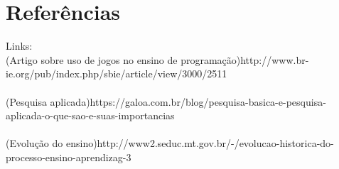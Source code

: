 \documentclass[12pt]{article}
\begin{document}
	
	\section{Referências} 
	
	Links:\\ 	(Artigo sobre uso de jogos no ensino de programação)http://www.br-ie.org/pub/index.php/sbie/article/view/3000/2511\\\\
			(Pesquisa aplicada)https://galoa.com.br/blog/pesquisa-basica-e-pesquisa-aplicada-o-que-sao-e-suas-importancias\\\\
			(Evolução do ensino)http://www2.seduc.mt.gov.br/-/evolucao-historica-do-processo-ensino-aprendizag-3
	
	
	
\end{document}

